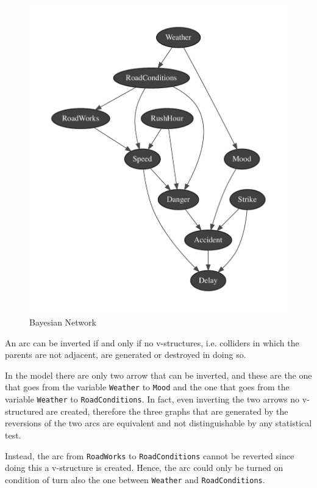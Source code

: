 \documentclass[a4paper,12pt]{article} %
\begin{document}
\begin{figure}[H]
	\centering
	\includegraphics[width=\linewidth]{../code/network.pdf}	
	\caption{Bayesian Network}
	\label{fig:net}
\end{figure}

An arc can be inverted if and only if no v-structures, i.e. colliders in which the parents are not adjacent, are generated or destroyed in doing so.
 
In the model there are only two arrow that can be inverted, and these are the one that goes from the variable \texttt{Weather} to \texttt{Mood} and the one that goes from the variable \texttt{Weather} to \texttt{RoadConditions}.
In fact, even inverting the two arrows no v-structured are created, therefore the three graphs that are generated by the reversions of the two arcs are equivalent and not distinguishable by any statistical test.

Instead, the arc from \texttt{RoadWorks} to \texttt{RoadConditions} cannot be reverted since doing this a v-structure is created. Hence, the arc could only be turned on condition of turn also the one between 
\texttt{Weather} and \texttt{RoadConditions}.
\end{document}
